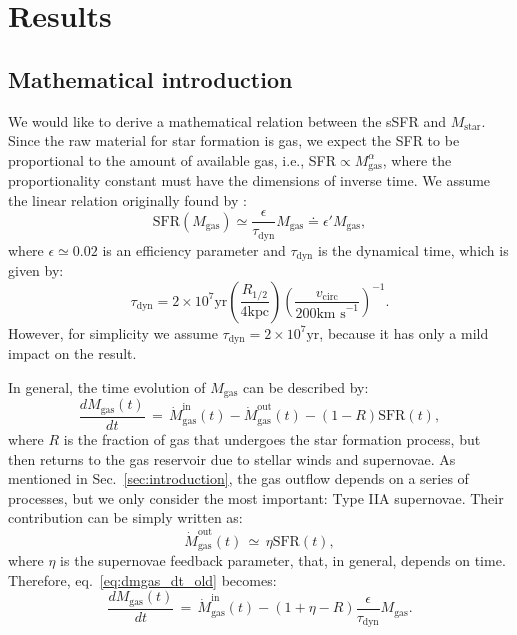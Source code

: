 \documentclass[fleqn,usenatbib]{mnras}
\begin{document}
\section{Results}\label{sec:results}
\subsection{Mathematical introduction}\label{sec:mathematical_introduction}
We would like to derive a mathematical relation between the sSFR and $M_\text{star}$. Since the raw material for star formation is gas, we expect the SFR to be proportional to the amount of available gas, i.e., SFR$\propto M_\text{gas}^\alpha$, where the proportionality constant must have the dimensions of inverse time. We assume the linear relation originally found by \citet{Kennicutt_1998}:
\begin{equation}
    \text{SFR}\left(M_\text{gas}\right) \simeq \dfrac{\epsilon}{\tau_\text{dyn}} M_\text{gas} \doteq \epsilon' M_\text{gas},
	\label{eq:SFR_vs_gasmas}
\end{equation}
where $\epsilon \simeq 0.02$ is an efficiency parameter and $\tau_\text{dyn}$ is the dynamical time, which is given by:
\begin{equation}
    \tau_\text{dyn} = 2 \times 10^7 \text{yr} \left(\dfrac{R_{1\slash2}}{4\text{kpc}}\right) \left(\dfrac{v_\text{circ}}{200\text{km s}^{-1}}\right)^{-1}.
	\label{eq:t_dynamical}
\end{equation}
However, for simplicity we assume $\tau_\text{dyn} = 2 \times 10^7 \text{yr}$, because it has only a mild impact on the result.

In general, the time evolution of $M_\text{gas}$ can be described by:
\begin{equation}
    \dfrac{dM_\text{gas}(t)}{dt} \, = \, \dot{M}_\text{gas}^\text{in}(t) - \dot{M}_\text{gas}^\text{out}(t) - \left(1-R\right)\text{SFR}(t),
	\label{eq:dmgas_dt_old}
\end{equation}
where $R$ is the fraction of gas that undergoes the star formation process, but then returns to the gas reservoir due to stellar winds and supernovae.
As mentioned in Sec.~\ref{sec:introduction}, the gas outflow depends on a series of processes, but we only consider the most important: Type IIA supernovae. Their contribution can be simply written as:
\begin{equation}
    \dot{M}_\text{gas}^\text{out}(t) \, \simeq \, \eta\text{SFR}(t),
	\label{eq:mgas_outflow}
\end{equation}
where $\eta$ is the supernovae feedback parameter, that, in general, depends on time. Therefore, eq.~\ref{eq:dmgas_dt_old} becomes:
\begin{equation}
    \dfrac{dM_\text{gas}(t)}{dt} \, = \, \dot{M}_\text{gas}^\text{in}(t) - \left(1+\eta-R\right) \dfrac{\epsilon}{\tau_\text{dyn}} M_\text{gas}.
	\label{eq:dmgas_dt}
\end{equation}
\end{document}
